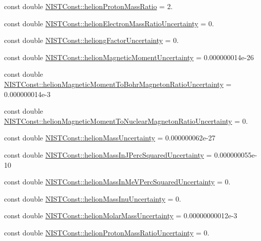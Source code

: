 \begin{DoxyCompactItemize}
\item 
const double \hyperlink{group___n_i_s_t_const-_helion_ga6ddd4a293fd1d7adac9a20dc6ee2a7d6}{N\+I\+S\+T\+Const\+::helion\+Proton\+Mass\+Ratio} = 2.
\item 
const double \hyperlink{group___n_i_s_t_const-_helion_ga2672db60c9c3de90d9815370c208d9cf}{N\+I\+S\+T\+Const\+::helion\+Electron\+Mass\+Ratio\+Uncertainty} = 0.
\item 
const double \hyperlink{group___n_i_s_t_const-_helion_gaa285cea359208efa3360fc621e6eda8c}{N\+I\+S\+T\+Const\+::heliong\+Factor\+Uncertainty} = 0.
\item 
const double \hyperlink{group___n_i_s_t_const-_helion_gae01ffe6f0fd72200ee03047a410823d4}{N\+I\+S\+T\+Const\+::helion\+Magnetic\+Moment\+Uncertainty} = 0.\+000000014e-\/26
\item 
const double \hyperlink{group___n_i_s_t_const-_helion_ga3caa6325d69fddccec75d45fe0578e83}{N\+I\+S\+T\+Const\+::helion\+Magnetic\+Moment\+To\+Bohr\+Magneton\+Ratio\+Uncertainty} = 0.\+000000014e-\/3
\item 
const double \hyperlink{group___n_i_s_t_const-_helion_gaf5d319d55655483f25e39f5036efd12a}{N\+I\+S\+T\+Const\+::helion\+Magnetic\+Moment\+To\+Nuclear\+Magneton\+Ratio\+Uncertainty} = 0.
\item 
const double \hyperlink{group___n_i_s_t_const-_helion_gad5ae82d7c587f925f7c4fcf4ab8415cf}{N\+I\+S\+T\+Const\+::helion\+Mass\+Uncertainty} = 0.\+000000062e-\/27
\item 
const double \hyperlink{group___n_i_s_t_const-_helion_ga2c68d6dedfd701a194ebad8211643803}{N\+I\+S\+T\+Const\+::helion\+Mass\+In\+J\+Perc\+Squared\+Uncertainty} = 0.\+000000055e-\/10
\item 
const double \hyperlink{group___n_i_s_t_const-_helion_ga760a45e0a6294d1c3596a0b5987fd8c7}{N\+I\+S\+T\+Const\+::helion\+Mass\+In\+Me\+V\+Perc\+Squared\+Uncertainty} = 0.
\item 
const double \hyperlink{group___n_i_s_t_const-_helion_ga447488faaf3a01ecc165dd47804b58e6}{N\+I\+S\+T\+Const\+::helion\+Mass\+Inu\+Uncertainty} = 0.
\item 
const double \hyperlink{group___n_i_s_t_const-_helion_gae7caa0d220514ff02b27152c71bd2206}{N\+I\+S\+T\+Const\+::helion\+Molar\+Mass\+Uncertainty} = 0.\+00000000012e-\/3
\item 
const double \hyperlink{group___n_i_s_t_const-_helion_gaae8cd14448f934c6e645d1a70686c082}{N\+I\+S\+T\+Const\+::helion\+Proton\+Mass\+Ratio\+Uncertainty} = 0.

\end{DoxyCompactItemize}
